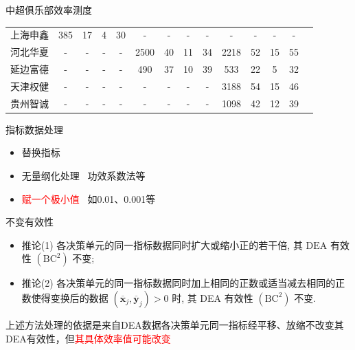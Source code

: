 \documentclass[]{beamer}
\begin{document}
\begin{frame}{中超俱乐部效率测度}
\begin{table}
{\begin{tabular}{cccccccccccccc}
            上海申鑫 & 385 & 17 & 4 & 30 & - & - & - & - & - & - & - & - \\
            河北华夏 & - & - & - & - & 2500 & 40 & 11 & 34 & 2218 & 52 & 15 & 55 \\
            延边富德 & - & - & - & - & 490 & 37 & 10 & 39 & 533 & 22 & 5 & 32 \\
            天津权健 & - & - & - & - & - & - & - & - & 3188 & 54 & 15 & 46 \\
            贵州智诚 & - & - & - & - & - & - & - & - & 1098 & 42 & 12 & 39 \\
            \bottomrule
        \end{tabular}}
    \end{table}
\end{frame}


\begin{frame}{指标数据处理}
    \begin{itemize}
        \item 替换指标
        \item 无量纲化处理 \ 功效系数法等
        \item \textcolor{red}{赋一个极小值} \ 如0.01、0.001等
    \end{itemize}
    \begin{block}{不变有效性}
        \begin{itemize}
            \item 推论(1) 各决策单元的同一指标数据同时扩大或缩小正的若干倍, 其 $\mathrm{DEA}$ 有效性 $\left(\mathrm{BC}^2\right)$ 不变;
            \item 推论(2) 各决策单元的同一指标数据同时加上相同的正数或适当减去相同的正数使得变换后的数据 $\left(\overline{\boldsymbol{x}}_j, \overline{\boldsymbol{y}}_j\right)>0$ 时, 其 DEA 有效性 $\left(\mathrm{BC}^2\right)$ 不变.
        \end{itemize}
    \end{block}
    上述方法处理的依据是来自DEA数据各决策单元同一指标经平移、放缩不改变其DEA有效性，但\textcolor{red}{其具体效率值可能改变}
\end{frame}
\end{document}
